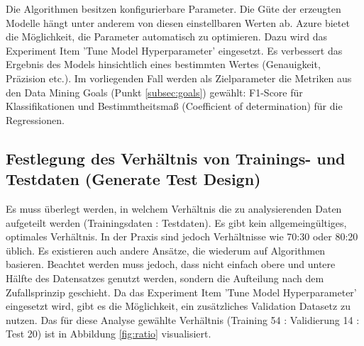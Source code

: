 Die Algorithmen besitzen konfigurierbare Parameter. Die Güte der erzeugten Modelle hängt unter anderem von diesen einstellbaren Werten ab. Azure bietet die Möglichkeit, die Parameter automatisch zu optimieren. Dazu wird das Experiment Item 'Tune Model Hyperparameter' eingesetzt. Es verbessert das Ergebnis des Models hinsichtlich eines bestimmten Wertes (Genauigkeit, Präzision etc.). Im vorliegenden Fall werden als Zielparameter die Metriken aus den Data Mining Goals (Punkt \ref{subsec:goals}) gewählt:
F1-Score für Klassifikationen und Bestimmtheitsmaß (Coefficient of determination) für die Regressionen.

\subsection*{Festlegung des Verhältnis von Trainings- und Testdaten (Generate Test Design)}
Es muss überlegt werden, in welchem Verhältnis die zu analysierenden Daten aufgeteilt werden (Trainingsdaten : Testdaten). Es gibt kein allgemeingültiges, optimales Verhältnis. In der Praxis sind jedoch Verhältnisse wie 70:30 oder 80:20 üblich. Es existieren auch andere Ansätze, die wiederum auf Algorithmen basieren.\citep{crowther_method_2005} Beachtet werden muss jedoch, dass nicht einfach obere und untere Hälfte des Datensatzes genutzt werden, sondern die Aufteilung nach dem Zufallsprinzip geschieht. Da das Experiment Item 'Tune Model Hyperparameter' eingesetzt wird, gibt es die Möglichkeit, ein zusätzliches Validation Datasetz zu nutzen. Das für diese Analyse gewählte Verhältnis (Training 54 : Validierung 14 : Test 20) ist in Abbildung \ref{fig:ratio} visualisiert.
